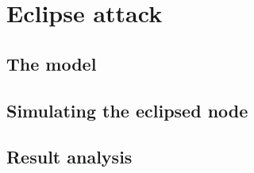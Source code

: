 \section{Eclipse attack}\label{sec:eclipse-poc}

\subsection{The model}\label{subsec:eclipse-model}

\subsection{Simulating the eclipsed node}\label{subsec:eclipse-impl}

\subsection{Result analysis}\label{subsec:eclipse-analysis}
